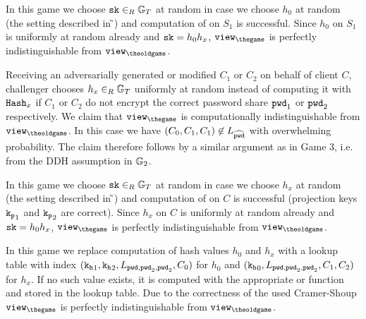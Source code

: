 

\Gh In this game we choose $\mathtt{sk}\in_R\mathbb{G}_T$ at random in case we choose $h_0$ at random (the setting described in \G{\theoldgame}) and computation of \sk on $S_1$ is successful.
Since $h_0$ on $S_1$ is uniformly at random already and $\mathtt{sk}=h_0h_x$, $\view_{\thegame}$ is perfectly indistinguishable from $\view_{\theoldgame}$.

\Gh Receiving an adversarially generated or modified $C_1$ or $C_2$ on behalf of client $C$, challenger \cC chooses $h_x\in_R\mathbb{G}_T$ uniformly at random instead of computing it with $\mathtt{Hash}_x$ if $C_1$ or $C_2$ do not encrypt the correct password share $\mathtt{pwd}_1$ or $\mathtt{pwd}_2$ respectively.
We claim that $\view_{\thegame}$ is computationally indistinguishable from $\view_{\theoldgame}$.
In this case we have $(C_0,C_1,C_1)\not\in L_{\widehat{\mathtt{pwd}}}$ with overwhelming probability.
The claim therefore follows by a similar argument as in Game 3, i.e. from the DDH assumption in $\mathbb{G}_2$.

\Gh In this game we choose $\mathtt{sk}\in_R\mathbb{G}_T$ at random in case we choose $h_x$ at random (the setting described in \G{\theoldgame}) and computation of \sk on $C$ is successful (projection keys $\mathtt{k_p}_1$ and $\mathtt{k_p}_2$ are correct).
Since $h_x$ on $C$ is uniformly at random already and $\mathtt{sk}=h_0h_x$, $\view_{\thegame}$ is perfectly indistinguishable from $\view_{\theoldgame}$.

\Gh In this game we replace computation of hash values $h_0$ and $h_x$ 
with a lookup table with index $(\mathtt{k_h}_1, \mathtt{k_h}_2, L_{\mathtt{pwd}, \mathtt{pwd}_2, \mathtt{pwd}_2}, C_0)$ for $h_0$ and $(\mathtt{k_h}_0, L_{\mathtt{pwd}, \mathtt{pwd}_2, \mathtt{pwd}_2}, C_1, C_2)$ for $h_x$.
If no such value exists, it is computed with the appropriate \Hash or \PHash function and stored in the lookup table.
Due to the correctness of the used Cramer-Shoup \TDSPHF $\view_{\thegame}$ is perfectly indistinguishable from $\view_{\theoldgame}$.

